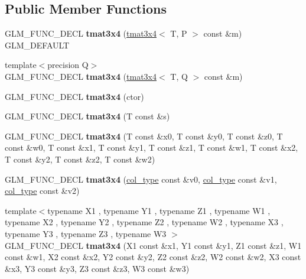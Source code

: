 \subsection*{Public Member Functions}
\begin{DoxyCompactItemize}
\item 
\hypertarget{structglm_1_1tmat3x4_ab424019515d481478f47bac3d055f621}{G\-L\-M\-\_\-\-F\-U\-N\-C\-\_\-\-D\-E\-C\-L {\bfseries tmat3x4} (\hyperlink{structglm_1_1tmat3x4}{tmat3x4}$<$ T, P $>$ const \&m) G\-L\-M\-\_\-\-D\-E\-F\-A\-U\-L\-T}\label{structglm_1_1tmat3x4_ab424019515d481478f47bac3d055f621}

\item 
\hypertarget{structglm_1_1tmat3x4_a7bb59eb4a55a89437df372f9cc6389e1}{{\footnotesize template$<$precision Q$>$ }\\G\-L\-M\-\_\-\-F\-U\-N\-C\-\_\-\-D\-E\-C\-L {\bfseries tmat3x4} (\hyperlink{structglm_1_1tmat3x4}{tmat3x4}$<$ T, Q $>$ const \&m)}\label{structglm_1_1tmat3x4_a7bb59eb4a55a89437df372f9cc6389e1}

\item 
\hypertarget{structglm_1_1tmat3x4_abfcbe719e1955b7fbc1f6ed19af1c795}{G\-L\-M\-\_\-\-F\-U\-N\-C\-\_\-\-D\-E\-C\-L {\bfseries tmat3x4} (ctor)}\label{structglm_1_1tmat3x4_abfcbe719e1955b7fbc1f6ed19af1c795}

\item 
\hypertarget{structglm_1_1tmat3x4_aaaa3d77c3791adef046c5aa2a7a90592}{G\-L\-M\-\_\-\-F\-U\-N\-C\-\_\-\-D\-E\-C\-L {\bfseries tmat3x4} (T const \&s)}\label{structglm_1_1tmat3x4_aaaa3d77c3791adef046c5aa2a7a90592}

\item 
\hypertarget{structglm_1_1tmat3x4_ac002767d2c3b371b75400303e160553f}{G\-L\-M\-\_\-\-F\-U\-N\-C\-\_\-\-D\-E\-C\-L {\bfseries tmat3x4} (T const \&x0, T const \&y0, T const \&z0, T const \&w0, T const \&x1, T const \&y1, T const \&z1, T const \&w1, T const \&x2, T const \&y2, T const \&z2, T const \&w2)}\label{structglm_1_1tmat3x4_ac002767d2c3b371b75400303e160553f}

\item 
\hypertarget{structglm_1_1tmat3x4_a80f60a03121cb766e5397ab56ac3e356}{G\-L\-M\-\_\-\-F\-U\-N\-C\-\_\-\-D\-E\-C\-L {\bfseries tmat3x4} (\hyperlink{structglm_1_1tvec4}{col\-\_\-type} const \&v0, \hyperlink{structglm_1_1tvec4}{col\-\_\-type} const \&v1, \hyperlink{structglm_1_1tvec4}{col\-\_\-type} const \&v2)}\label{structglm_1_1tmat3x4_a80f60a03121cb766e5397ab56ac3e356}

\item 
\hypertarget{structglm_1_1tmat3x4_ae404d0c07577464f544bcb9ff0a43511}{{\footnotesize template$<$typename X1 , typename Y1 , typename Z1 , typename W1 , typename X2 , typename Y2 , typename Z2 , typename W2 , typename X3 , typename Y3 , typename Z3 , typename W3 $>$ }\\G\-L\-M\-\_\-\-F\-U\-N\-C\-\_\-\-D\-E\-C\-L {\bfseries tmat3x4} (X1 const \&x1, Y1 const \&y1, Z1 const \&z1, W1 const \&w1, X2 const \&x2, Y2 const \&y2, Z2 const \&z2, W2 const \&w2, X3 const \&x3, Y3 const \&y3, Z3 const \&z3, W3 const \&w3)}\label{structglm_1_1tmat3x4_ae404d0c07577464f544bcb9ff0a43511}


\end{DoxyCompactItemize}
